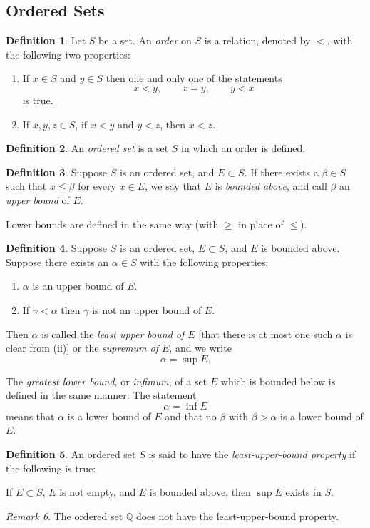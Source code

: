 \documentclass[11pt]{article}
\theoremstyle{definition}
\newtheorem{definition}{Definition}[section]
\theoremstyle{plain}
\theoremstyle{remark}
\newtheorem{remark}[definition]{Remark}
\newcommand{\Q}{\mathbb{Q}}
\begin{document}
\subsection{Ordered Sets}
\begin{definition}
Let $S$ be a set. An \emph{order} on $S$ is a relation, denoted by $<$, with the following two properties:
\begin{enumerate}
\item[(i)] If $x \in S$ and $y \in S$ then one and only one of the statements 
\[
x<y, \qquad x=y, \qquad y<x
\]
is true.
\item[(ii)] If $x,y,z \in S$, if $x<y$ and $y<z$, then $x<z$.
\end{enumerate}
\end{definition}
\begin{definition}
An \emph{ordered set} is a set $S$ in which an order is defined.
\end{definition}
\begin{definition}
Suppose $S$ is an ordered set, and $E \subset S$. If there exists a $\beta \in S$ such that $x \leq \beta$ for every $x \in E$, we say that $E$ is \emph{bounded above}, and call $\beta$ an \emph{upper bound} of $E$.

Lower bounds are defined in the same way (with $\geq$ in place of $\leq$).
\end{definition}
\begin{definition}
Suppose $S$ is an ordered set, $E \subset S$, and $E$ is bounded above. Suppose there exists an $\alpha \in S$ with the following properties: 
\begin{enumerate}
    \item[(i)] $\alpha$ is an upper bound of $E$.
    \item[(ii)] If $\gamma < \alpha$ then $\gamma$ is not an upper bound of $E$.
\end{enumerate}

Then $\alpha$ is called the \emph{least upper bound of $E$} [that there is at most one such $\alpha$ is clear from (ii)] or the \emph{supremum of $E$}, and we write \[\alpha=\sup E.\]

The \emph{greatest lower bound}, or \emph{infimum}, of a set $E$ which is bounded below is defined in the same manner: The statement \[\alpha=\inf E\] means that $\alpha$ is a lower bound of $E$ and that no $\beta$ with $\beta > \alpha$ is a lower bound of $E$.
\end{definition}
\begin{definition}
An ordered set $S$ is said to have the \emph{least-upper-bound property} if the following is true:

If $E \subset S$, $E$ is not empty, and $E$ is bounded above, then $\sup E$ exists in $S$.
\end{definition}
\begin{remark}
    The ordered set $\Q$ does not have the least-upper-bound property.
\end{remark}
\end{document}
